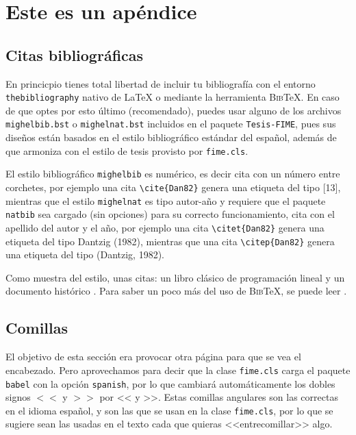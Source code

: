 \chapter{Este es un apéndice}

\section{Citas bibliográficas}

En princicpio tienes total libertad de incluir tu bibliografía con el entorno {\tt thebibliography} nativo de \LaTeX{} o mediante la herramienta \textsc{Bib}\TeX. En caso de que optes por esto último (recomendado), puedes usar alguno de los archivos {\tt mighelbib.bst} o {\tt mighelnat.bst} incluidos en el paquete {\tt Tesis-FIME}, pues sus diseños están basados en el estilo bibliográfico estándar del español, además de que armoniza con el estilo de tesis provisto por {\tt fime.cls}.

El estilo bibliográfico {\tt mighelbib} es numérico, es decir cita con un número entre corchetes, por ejemplo una cita \verb+\cite{Dan82}+ genera una etiqueta del tipo [13], mientras que el estilo {\tt mighelnat} es tipo autor-año y requiere que el paquete {\tt natbib} sea cargado (sin opciones) para su correcto funcionamiento, cita con el apellido del autor y el año, por ejemplo una cita \verb+\citet{Dan82}+ genera una etiqueta del tipo Dantzig (1982), mientras que una cita \verb+\citep{Dan82}+ genera una etiqueta del tipo (Dantzig, 1982).

Como muestra del estilo, unas citas: un libro clásico de programación lineal \cite{Baz04} y un documento histórico \cite{Dan82}. Para saber un poco más del uso de \textsc{Bib}\TeX, se puede leer \cite{Mat11}.

\section{Comillas}

El objetivo de esta sección era provocar otra página para que se vea el encabezado. Pero aprovechamos para decir que la clase {\tt fime.cls} carga el paquete {\tt babel} con la opción {\tt spanish}, por lo que cambiará automáticamente los dobles signos $<<$ y $>>$ por << y >>. Estas comillas angulares son las correctas en el idioma español, y son las que se usan en la clase {\tt fime.cls}, por lo que se sugiere sean las usadas en el texto cada que quieras <<entrecomillar>> algo.

